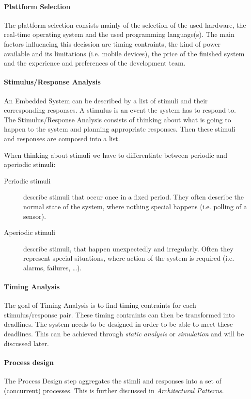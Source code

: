 \documentclass[10pt,a4paper,titlepage,draft]{article} %
\begin{document}
\paragraph{Plattform Selection}
The plattform selection consists mainly of the selection of the used hardware, the real-time operating system and the used programming language(s).
The main factors influencing this decission are timing contraints, the kind of power available and its limitations (i.e. mobile devices), the price of the finished system and the experience and preferences of the development team.

\paragraph{Stimulus/Response Analysis}
An Embedded System can be described by a list of stimuli and their corresponding responses.
A stimulus is an event the system has to respond to.
The Stimulus/Response Analysis consists of thinking about what is going to happen to the system and planning appropriate responses.
Then these stimuli and responses are composed into a list.

When thinking about stimuli we have to differentiate between periodic and aperiodic stimuli:
\begin{description}
	\item[Periodic stimuli] describe stimuli that occur once in a fixed period.
	They often describe the normal state of the system, where nothing special happens (i.e. polling of a sensor).
	\item[Aperiodic stimuli] describe stimuli, that happen unexpectedly and irregularly.
	Often they represent special situations, where action of the system is required (i.e. alarms, failures, \dots).
\end{description}

\paragraph{Timing Analysis}
The goal of Timing Analysis is to find timing contraints for each stimulus/response pair.
These timing contraints can then be transformed into deadlines.
The system needs to be designed in order to be able to meet these deadlines.
This can be achieved through \emph{static analysis} or \emph{simulation} and will be discussed later.

\paragraph{Process design}
The Process Design step aggregates the stimli and responses into a set of (concurrent) processes.
This is further discussed in \emph{Architectural Patterns}.
\end{document}
